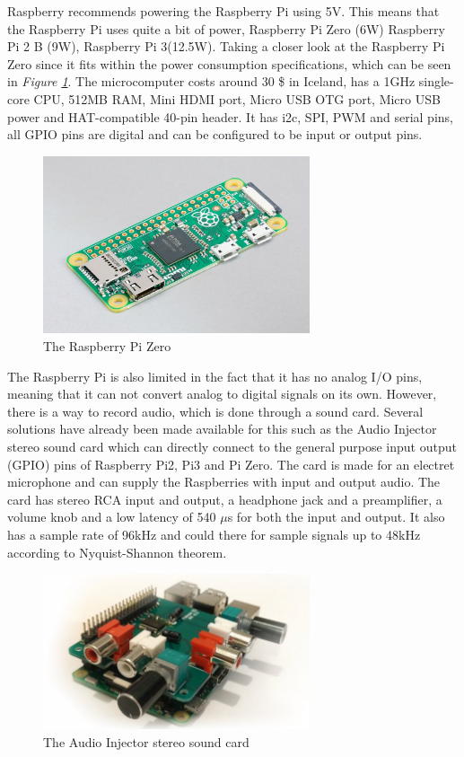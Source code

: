 Raspberry recommends powering the Raspberry Pi using 5V.
This means that the Raspberry Pi uses quite a bit of power, Raspberry Pi Zero (6W) Raspberry Pi 2 B (9W), Raspberry Pi 3(12.5W).
Taking a closer look at the Raspberry Pi Zero since it fits within the power consumption specifications, which can be seen in \textit{Figure \ref{fig:RPIGPIO}}.
The microcomputer costs around 30 \$ in Iceland, has a 1GHz single-core CPU, 512MB RAM, Mini HDMI port, Micro USB OTG port,
Micro USB power and HAT-compatible 40-pin header.
It has i2c, SPI, PWM and serial pins, all GPIO pins are digital and can be configured to be input or output pins.


\begin{figure}[h]
    \centering
    \includegraphics[width=0.70\textwidth]{graphics/ZeroGPIO.png}
    \caption{The Raspberry Pi Zero \cite{foundation_buy_nodate}}
    \label{fig:RPIGPIO}
\end{figure}

The Raspberry Pi is also limited in the fact that it has no analog I/O pins, meaning that it can not convert analog to digital signals on its own.
However, there is a way to record audio, which is done through a sound card.
Several solutions have already been made available for this such as the Audio Injector stereo sound card which can directly connect to the general purpose input output (GPIO) pins of Raspberry Pi2, Pi3 and Pi Zero.
The card is made for an electret microphone and can supply the Raspberries with input and output audio.
The card has stereo RCA input and output, a headphone jack and a preamplifier, a volume knob and a low latency of 540 $\mu$s for both the input and output.
It also has a sample rate of 96kHz and could there for sample signals up to 48kHz according to Nyquist-Shannon theorem\cite{noauthor_rpi_nodate}.

\begin{figure}[h]
    \centering
    \includegraphics[width=0.70\textwidth]{graphics/rpisoundcard.jpg}
    \caption{The Audio Injector stereo sound card \cite{noauthor_rpi_nodate}}
    \label{fig:rpisoundcard}
\end{figure}


